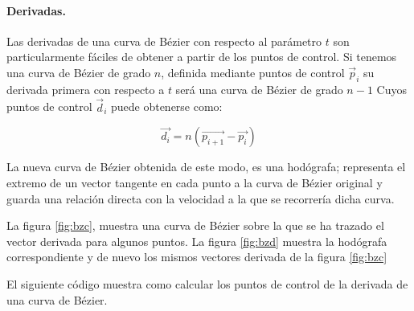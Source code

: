 %        
\begin{paracol}{2}
\paragraph{Derivadas.} Las derivadas de una curva de Bézier con respecto al parámetro $t$ son particularmente fáciles de obtener a partir de los puntos de control. Si tenemos una curva de Bézier de grado $n$, definida mediante puntos de control $\vec{p}_i$ su derivada primera con respecto a $t$ será una curva de Bézier de grado $n-1$ Cuyos puntos de control $\vec{d}_i$  puede obtenerse como:
\end{paracol}
\begin{equation*}
\vec{d_i} = n\left(\vec{p_{i+1}} -\vec{p_i}\right)
\end{equation*}
\begin{paracol}{2}
La nueva curva de Bézier obtenida de este modo, es una hodógrafa; representa el extremo de un vector tangente en cada punto a la curva de Bézier original  y guarda una relación directa con la velocidad a la que se recorrería dicha curva. 

La figura \ref{fig:bzc}, muestra una curva de Bézier sobre la que se ha trazado el vector derivada para algunos puntos. La figura \ref{fig:bzd} muestra la hodógrafa correspondiente y de nuevo los mismos vectores derivada de la figura \ref{fig:bzc}

El siguiente código muestra como calcular los puntos de control de la derivada de una curva de Bézier.
\end{paracol}

